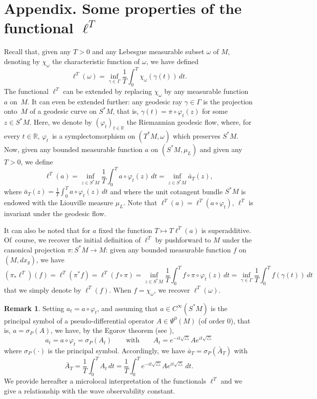 \documentclass[10pt]{amsart}
\def\R{\mathbb{R}}
\theoremstyle{definition}
\newtheorem{remark}{Remark}
\begin{document}
\appendix
{}\section*{Appendix. Some properties of the functional \texorpdfstring{$\ell^T$}{lT}}\label{app_ellT}
Recall that, given any $T>0$ and any Lebesgue measurable subset $\omega$ of $M$, denoting by $\chi_\omega$ the characteristic function of $\omega$, we have defined
\[
\ell^T(\omega) = \inf_{\gamma\in\Gamma} \frac{1}{T} \int_0^T \chi_\omega(\gamma(t))\, dt.
\]
The functional $\ell^T$ can be extended by replacing $\chi_\omega$ by any measurable function~$a$ on~$M$. It can even be extended further:
any geodesic ray $\gamma\in\Gamma$ is the projection onto~$M$ of a geodesic curve on $S^*M$, that is, $\gamma(t) = \pi\circ\varphi_t(z)$ for some $z\in S^*M$. Here, we denote by $(\varphi_t)_{t\in\R}$ the Riemannian geodesic flow, where, for every $t\in\R$, $\varphi_t$~is a symplectomorphism on $(T^*M,\omega)$ which preserves $S^*M$.
Now, given any bounded measurable function $a$ on $(S^*M,\mu_L)$ and given any $T>0$, we define
\[
\ell^T(a) = \inf_{z\in S^*M} \frac{1}{T} \int_0^T a\circ\varphi_t(z)\, dt = \inf_{z\in S^*M} \bar a_T(z),
\]
where $\bar a_T(z) = \frac{1}{T} \int_0^T a\circ\varphi_t(z)\, dt$
and where the unit cotangent bundle $S^*M$ is endowed with the Liouville measure $\mu_L$.
Note that $\ell^T(a)=\ell^T(a\circ\varphi_t)$, \ie $\ell^T$ is invariant under the geodesic flow.

It can also be noted that for $a$ fixed the function $T\mapsto T \ell^T(a)$ is superadditive. Of~course, we recover the initial definition of $\ell^T$ by pushforward to $M$ under the canonical projection $\pi:S^*M\rightarrow M$: given any bounded measurable function $f$ on $(M,dx_g)$, we have
\[
(\pi_*\ell^T)(f) = \ell^T(\pi^*f) = \ell^T(f\circ\pi) = \inf_{z\in S^*M} \frac{1}{T} \int_0^T f\circ\pi\circ\varphi_t(z)\, dt = \inf_{\gamma\in\Gamma} \frac{1}{T} \int_0^T f(\gamma(t))\, dt
\]
that we simply denote by $\ell^T(f)$. When $f=\chi_\omega$, we recover $\ell^T(\omega)$.

\begin{remark}\label{remEgorov}
Setting $a_t=a\circ\varphi_t$, and assuming that {$a\in C^\infty(S^*M)$} is the principal symbol of a pseudo-differential operator $A\in\Psi^0(M)$ (of order $0$), that is, $a=\sigma_P(A)$, we have, by the Egorov theorem (see \cite{Zworski}),
\[
a_t = a\circ\varphi_t = \sigma_P(A_t)\qquad\textrm{with}\qquad A_t = e^{-it\sqrt{\triangle}}Ae^{it\sqrt{\triangle}}
\]
where $\sigma_P(\cdot)$ is the principal symbol.
Accordingly, we have $\bar a_T=\sigma_P(\bar A_T)$ with
\[
\bar A_T=\frac{1}{T}\int_0^T A_t\, dt=\frac{1}{T}\int_0^T e^{-it\sqrt{\triangle}}Ae^{it\sqrt{\triangle}}\, dt.
\]
We provide hereafter a microlocal interpretation of the functionals $\ell^T$ and we give a relationship with the wave observability constant.
\end{remark}
\end{document}
